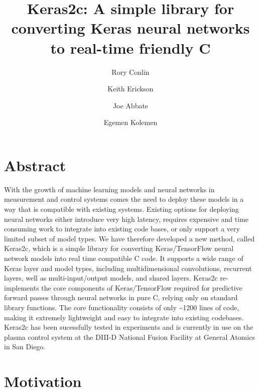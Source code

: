 \documentclass{article}
\title{Keras2c: A simple library for converting Keras neural networks
to real-time friendly C}
\author[1]{Rory Conlin}
\author[2]{Keith Erickson}
\author[3]{Joe Abbate}
\author[1,2]{Egemen Kolemen}
\affil[1]{Dept. of Mechanical \& Aerospace Engineering, Princeton University}
\affil[2]{Princeton Plasma Physics Laboratory}
\affil[3]{Dept. of Astrophysical Sciences, Princeton University}
\begin{document}
\maketitle


\section*{Abstract}\label{abstract}

With the growth of machine learning models and neural networks in
measurement and control systems comes the need to deploy these models in
a way that is compatible with existing systems. Existing options for
deploying neural networks either introduce very high latency, requires
expensive and time consuming work to integrate into existing code bases,
or only support a very limited subset of model types. We have therefore
developed a new method, called Keras2c, which is a simple library for
converting Keras/TensorFlow neural network models into real time
compatible C code. It supports a wide range of Keras layer and model
types, including multidimensional convolutions, recurrent layers, well
as multi-input/output models, and shared layers. Keras2c re-implements
the core components of Keras/TensorFlow required for predictive forward
passes through neural networks in pure C, relying only on standard
library functions. The core functionality consists of only
\textasciitilde{}1200 lines of code, making it extremely lightweight and
easy to integrate into existing codebases. Keras2c has been sucessfully
tested in experiments and is currently in use on the plasma control
system at the DIII-D National Fusion Facility at General Atomics in San
Diego.


\section*{Motivation}\label{motivation}
\end{document}
